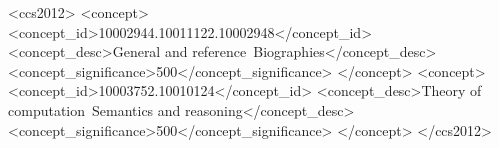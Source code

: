 \documentclass[sigconf]{acmart}
\begin{document}
\begin{CCSXML}
<ccs2012>
    <concept>
        <concept_id>10002944.10011122.10002948</concept_id>
        <concept_desc>General and reference~Biographies</concept_desc>
        <concept_significance>500</concept_significance>
    </concept>
    <concept>
        <concept_id>10003752.10010124</concept_id>
        <concept_desc>Theory of computation~Semantics and reasoning</concept_desc>
        <concept_significance>500</concept_significance>
    </concept>
</ccs2012>
\end{CCSXML}




\maketitle
\end{document}
